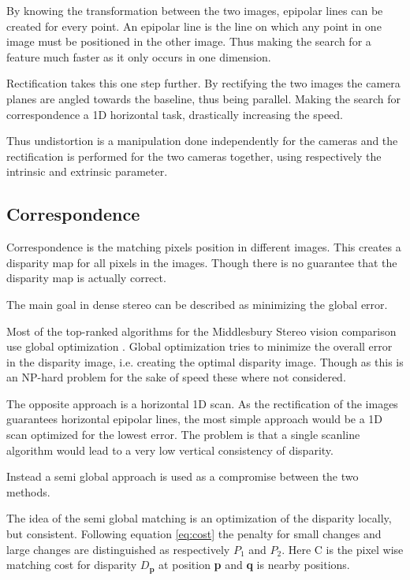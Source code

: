 By knowing the transformation between the two images, epipolar lines can be created for every point. An epipolar line is the line on which any point in one image must be positioned in the other image. Thus making the search for a feature much faster as it only occurs in one dimension.

Rectification takes this one step further. By rectifying the two images the camera planes are angled towards the baseline, thus being parallel. Making the search for correspondence a 1D horizontal task, drastically increasing the speed.

Thus undistortion is a manipulation done independently for the cameras and the rectification is performed for the two cameras together, using respectively the intrinsic and extrinsic parameter.


\subsection{Correspondence} \label{sec:correspondence}

Correspondence is the matching pixels position in different images. This creates a disparity map for all pixels in the images. Though there is no guarantee that the disparity map is actually correct. 

The main goal in dense stereo can be described as minimizing the global error. 

Most of the top-ranked algorithms for the Middlesbury Stereo vision comparison use global optimization \cite{Hirschmuller2008}. Global optimization tries to minimize the overall error in the disparity image, i.e. creating the optimal disparity image. Though as this is an NP-hard problem for the sake of speed these where not considered.

The opposite approach is a horizontal 1D scan. As the rectification of the images guarantees horizontal epipolar lines, the most simple approach would be a 1D scan optimized for the lowest error. The problem is that a single scanline algorithm would lead to a very low vertical consistency of disparity. 

Instead a semi global approach is used as a compromise between the two methods. 

The idea of the semi global matching is an optimization of the disparity locally, but consistent. Following equation \ref{eq:cost} the penalty for small changes and large changes are distinguished as respectively $P_{1}$ and $P_{2}$. Here C is the pixel wise matching cost for disparity $D_{\textbf{p}}$ at position \textbf{p} and \textbf{q} is nearby positions.

